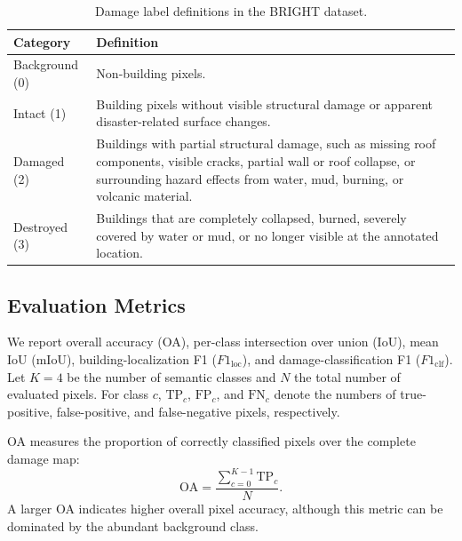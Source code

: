 \documentclass[journal]{IEEEtran}
\begin{document}
    \begin{table}[!t]
    \caption{Damage label definitions in the BRIGHT dataset.}
    \label{tab:bright_label_definitions}
    \centering
    \footnotesize
    \setlength{\tabcolsep}{3pt}
    \renewcommand{\arraystretch}{1.1}
    \begin{tabular}{>{\raggedright\arraybackslash}p{}
                    >{\raggedright\arraybackslash}p{}}
    \toprule
    Category & Definition \\
    \midrule
    Background (0) & Non-building pixels. \\
    Intact (1) & Building pixels without visible structural damage or apparent disaster-related surface changes. \\
    Damaged (2) & Buildings with partial structural damage, such as missing roof components, visible cracks, partial wall or roof collapse, or surrounding hazard effects from water, mud, burning, or volcanic material. \\
    Destroyed (3) & Buildings that are completely collapsed, burned, severely covered by water or mud, or no longer visible at the annotated location. \\
    \bottomrule
    \end{tabular}
    \renewcommand{\arraystretch}{1.0}
    \end{table}
    
    \subsection{Evaluation Metrics}
    \label{subsec:metrics}
    
    We report overall accuracy (OA), per-class intersection over union (IoU), mean IoU (mIoU), building-localization F1 ($F1_{\mathrm{loc}}$), and damage-classification F1 ($F1_{\mathrm{clf}}$). Let $K=4$ be the number of semantic classes and $N$ the total number of evaluated pixels. For class $c$, $\mathrm{TP}_c$, $\mathrm{FP}_c$, and $\mathrm{FN}_c$ denote the numbers of true-positive, false-positive, and false-negative pixels, respectively.
    
    OA measures the proportion of correctly classified pixels over the complete damage map:
    \begin{equation}
        \mathrm{OA}
        =
        \frac{\sum_{c=0}^{K-1}\mathrm{TP}_{c}}{N}.
        \label{eq:oa}
    \end{equation}
    A larger OA indicates higher overall pixel accuracy, although this metric can be dominated by the abundant background class.
    
\end{document}
